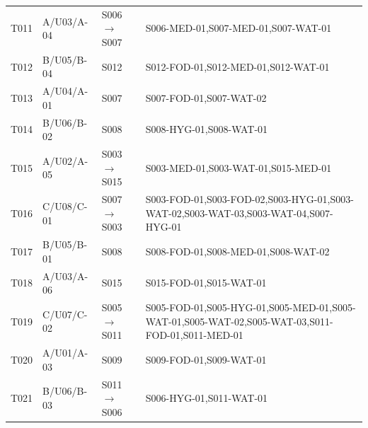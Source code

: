 \begin{longtable}{@{}>{\centering\arraybackslash}p{1.00cm}>{\raggedright\arraybackslash}p{2.80cm}>{\raggedright\arraybackslash}p{3.10cm}>{\raggedright\arraybackslash}p{7.60cm}@{}}
T011 & A/U03/A-04 & S006$\to$S007 & \mbox{S006-MED-01},\allowbreak \mbox{S007-MED-01},\allowbreak \mbox{S007-WAT-01} \\
T012 & B/U05/B-04 & S012 & \mbox{S012-FOD-01},\allowbreak \mbox{S012-MED-01},\allowbreak \mbox{S012-WAT-01} \\
T013 & A/U04/A-01 & S007 & \mbox{S007-FOD-01},\allowbreak \mbox{S007-WAT-02} \\
T014 & B/U06/B-02 & S008 & \mbox{S008-HYG-01},\allowbreak \mbox{S008-WAT-01} \\
T015 & A/U02/A-05 & S003$\to$S015 & \mbox{S003-MED-01},\allowbreak \mbox{S003-WAT-01},\allowbreak \mbox{S015-MED-01} \\
T016 & C/U08/C-01 & S007$\to$S003 & \mbox{S003-FOD-01},\allowbreak \mbox{S003-FOD-02},\allowbreak \mbox{S003-HYG-01},\allowbreak \mbox{S003-WAT-02},\allowbreak \mbox{S003-WAT-03},\allowbreak \mbox{S003-WAT-04},\allowbreak \mbox{S007-HYG-01} \\
T017 & B/U05/B-01 & S008 & \mbox{S008-FOD-01},\allowbreak \mbox{S008-MED-01},\allowbreak \mbox{S008-WAT-02} \\
T018 & A/U03/A-06 & S015 & \mbox{S015-FOD-01},\allowbreak \mbox{S015-WAT-01} \\
T019 & C/U07/C-02 & S005$\to$S011 & \mbox{S005-FOD-01},\allowbreak \mbox{S005-HYG-01},\allowbreak \mbox{S005-MED-01},\allowbreak \mbox{S005-WAT-01},\allowbreak \mbox{S005-WAT-02},\allowbreak \mbox{S005-WAT-03},\allowbreak \mbox{S011-FOD-01},\allowbreak \mbox{S011-MED-01} \\
T020 & A/U01/A-03 & S009 & \mbox{S009-FOD-01},\allowbreak \mbox{S009-WAT-01} \\
T021 & B/U06/B-03 & S011$\to$S006 & \mbox{S006-HYG-01},\allowbreak \mbox{S011-WAT-01} \\
\end{longtable}
\endgroup


